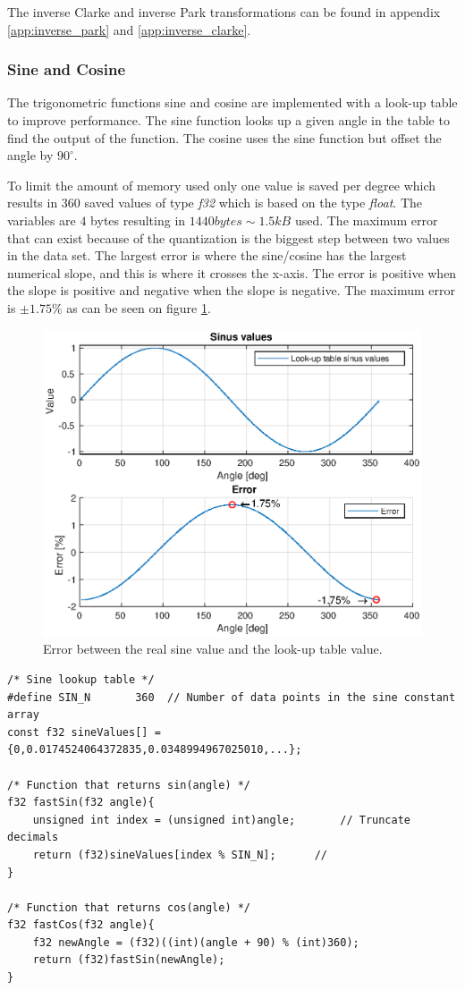 The inverse Clarke and inverse Park transformations can be found in appendix \ref{app:inverse_park} and \ref{app:inverse_clarke}.


\subsubsection{Sine and Cosine}
\label{sec:sine_cosine}
The trigonometric functions sine and cosine are implemented with a look-up table to improve performance. The sine function looks up a given angle in the table to find the output of the function. The cosine uses the sine function but offset the angle by $90 ^{\circ}$. 

To limit the amount of memory used only one value is saved per degree which results in $360$ saved values of type \textit{f32} which is based on the type \textit{float}. The variables are $4$ bytes resulting in $1440 bytes \sim 1.5kB$ used.
The maximum error that can exist because of the quantization is the biggest step between two values in the data set. 
The largest error is where the sine/cosine has the largest numerical slope, and this is where it crosses the x-axis. The error is positive when the slope is positive and negative when the slope is negative. The maximum error is $\pm 1.75 \%$ as can be seen on figure \ref{fig:sinus_lookup_error}. 
\begin{figure}[H]
	\centering
	\includegraphics[width=0.6 \textwidth]{pictures/software/sinus_lookup_error.eps}
	\caption{Error between the real sine value and the look-up table value.}
	\label{fig:sinus_lookup_error}
\end{figure}


\begin{lstlisting}[style=c, caption=Implementation lookup tables., label=code:lookup_table]
/* Sine lookup table */
#define SIN_N 		360	 // Number of data points in the sine constant array
const f32 sineValues[] = {0,0.0174524064372835,0.0348994967025010,...};

/* Function that returns sin(angle) */
f32 fastSin(f32 angle){
	unsigned int index = (unsigned int)angle;       // Truncate decimals
	return (f32)sineValues[index % SIN_N];      // 
}	

/* Function that returns cos(angle) */
f32 fastCos(f32 angle){
	f32 newAngle = (f32)((int)(angle + 90) % (int)360);
	return (f32)fastSin(newAngle);
}
\end{lstlisting}
